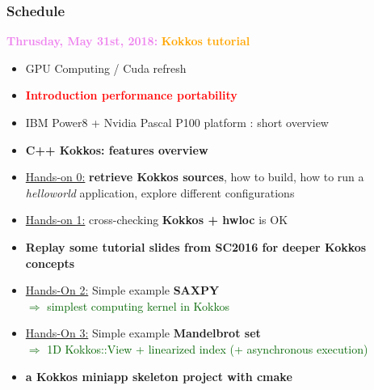 \begin{frame}
  \frametitle{Schedule}

  {\bf \large \textcolor{violet}{Thrusday, May 31st, 2018:}} \textcolor{orange}{\bf Kokkos tutorial}
  \begin{itemize}
  \item GPU Computing / Cuda refresh %
  \item \textcolor{red}{\bf Introduction performance portability} %
  \item IBM Power8 + Nvidia Pascal P100 platform : short overview %
  \item \textbf{C++ Kokkos: features overview} %
  \item \textcolor{blue}{\hyperlink{handson0}{Hands-on 0:}} \textbf{retrieve Kokkos sources}, how to build, how to run a \textit{helloworld} application, explore different configurations %
  \item \textcolor{blue}{\hyperlink{handson1}{Hands-on 1:}} cross-checking \textbf{Kokkos + hwloc} is OK
  \item \textbf{Replay some tutorial slides from SC2016 for deeper Kokkos concepts}
  \item \textcolor{blue}{\hyperlink{handson2}{Hands-On 2:}} Simple example \textbf{SAXPY}\\
    \textcolor{darkgreen}{$\Rightarrow$ simplest computing kernel in Kokkos} %
  \item \textcolor{blue}{\hyperlink{handson3}{Hands-On 3:}} Simple example \textbf{Mandelbrot set}\\
    \textcolor{darkgreen}{$\Rightarrow$ 1D Kokkos::View + linearized index (+ asynchronous execution)} %
  \item {\bf a Kokkos miniapp skeleton project with cmake} 
  \end{itemize}
\end{frame}

